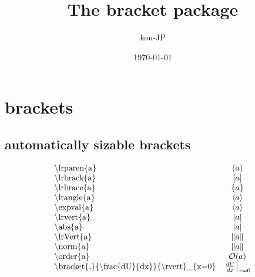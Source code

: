 \documentclass{article}
\title{The \textsf{bracket} package}
\author{kou-JP}
\date{\today}
\begin{document}
\maketitle
\section{brackets}
\subsection{automatically sizable brackets}
\begin{equation*}
     \begin{array}{lc}
          \text{\textbackslash lrparen\{a\}}                                                                     & \lrparen{a}                              \\
          \text{\textbackslash lrbrack\{a\}}                                                                     & \lrbrack{a}                              \\
          \text{\textbackslash lrbrace\{a\}}                                                                     & \lrbrace{a}                              \\
          \text{\textbackslash lrangle\{a\}}                                                                     & \lrangle{a}                              \\
          \text{\textbackslash expval\{a\}}                                                                      & \expval{a}                               \\
          \text{\textbackslash lrvert\{a\}}                                                                      & \lrvert{a}                               \\
          \text{\textbackslash abs\{a\}}                                                                         & \abs{a}                                  \\
          \text{\textbackslash lrVert\{a\}}                                                                      & \lrVert{a}                               \\
          \text{\textbackslash norm\{a\}}                                                                        & \norm{a}                                 \\
          \text{\textbackslash order\{a\}}                                                                       & \order{a}                                \\
          \text{\textbackslash bracket\{.\}\{\textbackslash frac\{dU\}\{dx\}\}\{\textbackslash rvert\}\_\{x=0\}} & \bracket{.}{\frac{dU}{dx}}{\rvert}_{x=0} \\
     \end{array}
\end{equation*}
\end{document}
